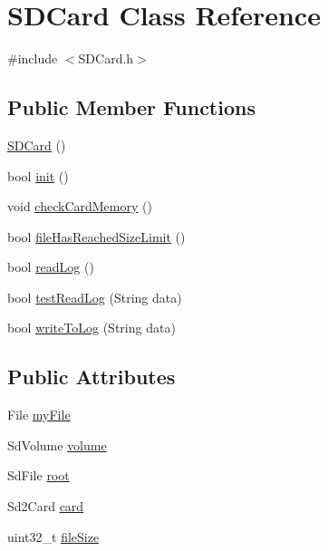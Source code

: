 \hypertarget{class_s_d_card}{}\section{S\+D\+Card Class Reference}
\label{class_s_d_card}


{\ttfamily \#include $<$S\+D\+Card.\+h$>$}

\subsection*{Public Member Functions}
\begin{DoxyCompactItemize}
\item 
\mbox{\hyperlink{class_s_d_card_aa57f64cf28817d210706222f60be9001}{S\+D\+Card}} ()
\item 
bool \mbox{\hyperlink{class_s_d_card_a7d5b2551a395d7bf883f425fb98b0b0d}{init}} ()
\item 
void \mbox{\hyperlink{class_s_d_card_a62c472309bd91560a29430d6946c05fb}{check\+Card\+Memory}} ()
\item 
bool \mbox{\hyperlink{class_s_d_card_ab43bfe585365622d71e30194a404125c}{file\+Has\+Reached\+Size\+Limit}} ()
\item 
bool \mbox{\hyperlink{class_s_d_card_a9c0edb3dd7e157501776d9760705a757}{read\+Log}} ()
\item 
bool \mbox{\hyperlink{class_s_d_card_ad5832b1d4274a99ca975f4c570584f53}{test\+Read\+Log}} (String data)
\item 
bool \mbox{\hyperlink{class_s_d_card_aa65251052d32bcaff9f087080118525f}{write\+To\+Log}} (String data)
\end{DoxyCompactItemize}
\subsection*{Public Attributes}
\begin{DoxyCompactItemize}
\item 
File \mbox{\hyperlink{class_s_d_card_a2e9756d5c5478bee2d7977a0c66ec47f}{my\+File}}
\item 
Sd\+Volume \mbox{\hyperlink{class_s_d_card_a143b4a79b09f0c1d6d71155b51dfefcb}{volume}}
\item 
Sd\+File \mbox{\hyperlink{class_s_d_card_a6e02af8a10a45955da7c560ea148ca4d}{root}}
\item 
Sd2\+Card \mbox{\hyperlink{class_s_d_card_a20919e15549972b09ad3c063c35fcf59}{card}}
\item 
uint32\+\_\+t \mbox{\hyperlink{class_s_d_card_a9f97edfb78131f459dbbda495903663e}{file\+Size}}
\end{DoxyCompactItemize}


